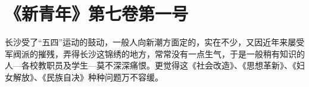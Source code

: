 
\section[《新青年》第七卷第一号（一九一七年）]{《新青年》第七卷第一号}
长沙受了“五四”运动的鼓动，一般人向新潮方面定的，实在不少，又因近年来屡受军阀派的摧残，弄得长沙这锦绣的地方，常常没有一点生气，于是一般稍有知识的人—各校教职员及学生—莫不深深痛恨。更觉得这《社会改造》、《思想革新》、《妇女解放》、《民族自决》种种问题万不容缓。